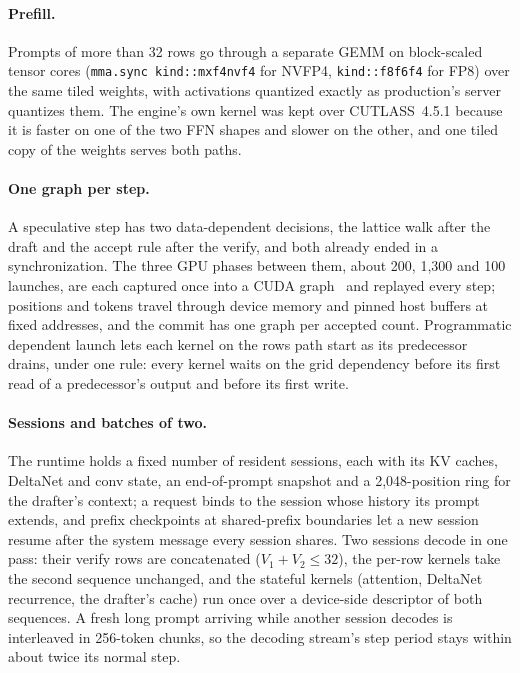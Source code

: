 \documentclass[11pt]{article}
\newcommand{\code}[1]{\texttt{#1}}
\begin{document}
\paragraph{Prefill.}
Prompts of more than 32 rows go through a separate GEMM on block-scaled tensor cores (\code{mma.sync kind::mxf4nvf4} for
NVFP4, \code{kind::f8f6f4} for FP8) over the same tiled weights, with activations quantized exactly as production's
server quantizes them. The engine's own kernel was kept over CUTLASS~4.5.1 because it is faster on one of the two FFN
shapes and slower on the other, and one tiled copy of the weights serves both paths.

\paragraph{One graph per step.}
A speculative step has two data-dependent decisions, the lattice walk after the draft and the accept rule after the
verify, and both already ended in a synchronization. The three GPU phases between them, about 200, 1,300 and 100 launches,
are each captured once into a CUDA graph~\cite{cudaguide} and replayed every step; positions and tokens travel through device memory and
pinned host buffers at fixed addresses, and the commit has one graph per accepted count. Programmatic dependent launch lets
each kernel on the rows path start as its predecessor drains, under one rule: every kernel waits on the grid dependency
before its first read of a predecessor's output and before its first write.

\paragraph{Sessions and batches of two.}
The runtime holds a fixed number of resident sessions, each with its KV caches, DeltaNet and conv state, an end-of-prompt
snapshot and a 2,048-position ring for the drafter's context; a request binds to the session whose history its prompt
extends, and prefix checkpoints at shared-prefix boundaries let a new session resume after the system message every
session shares. Two sessions decode in one pass: their verify rows are concatenated ($V_1+V_2\le32$), the per-row
kernels take the second sequence unchanged, and the stateful kernels (attention, DeltaNet recurrence, the drafter's cache)
run once over a device-side descriptor of both sequences. A fresh long prompt arriving while another session decodes is
interleaved in 256-token chunks, so the decoding stream's step period stays within about twice its normal step.
\end{document}
